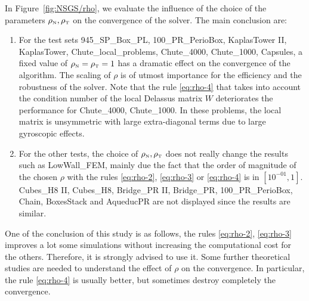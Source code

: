 In Figure~\ref{fig:NSGS/rho}, we evaluate the influence of the choice of the parameters $\rho_{\hbox{\tiny{N}}}, \rho_{\hbox{\tiny{T}}}$ on the convergence of the solver. The main conclusion are:
\begin{enumerate}
\item For the test sets 945\_SP\_Box\_PL, 100\_PR\_PerioBox, KaplasTower II, KaplasTower, Chute\_local\_problems, Chute\_4000, Chute\_1000, Capsules, a fixed value of $\rho_{\hbox{\tiny{N}}}=\rho_{\hbox{\tiny{T}}}=1$ has a dramatic effect on the convergence of the algorithm. The scaling of $\rho$ is of utmost importance for the efficiency and the robustness of the solver. Note that the rule  \eqref{eq:rho-4} that takes into account the condition number of the local Delassus matrix $W$ deteriorates the performance for  Chute\_4000, Chute\_1000. In these problems, the local matrix is unsymmetric with large extra-diagonal terms due to large gyroscopic effects.
  
\item For the other tests, the choice of $\rho_{\hbox{\tiny{N}}},\rho_{\hbox{\tiny{T}}}$ does not really change the results such as LowWall\_FEM, mainly due the fact that the order of magnitude of the chosen $\rho$ with the rules \eqref{eq:rho-2}, \eqref{eq:rho-3} or \eqref{eq:rho-4} is in $[10^{-01}, 1]$. Cubes\_H8 II, Cubes\_H8, Bridge\_PR II, Bridge\_PR, 100\_PR\_PerioBox, Chain, BoxesStack and AqueducPR are not displayed since the results are similar.
\end{enumerate}
One of the conclusion of this study is as follows, the rules \eqref{eq:rho-2}, \eqref{eq:rho-3} improves a lot some simulations without increasing the computational cost for the others. Therefore, it is strongly advised to use it. Some further theoretical studies are needed to understand the effect of $\rho$ on the convergence. In particular, the rule \eqref{eq:rho-4} is usually better, but sometimes destroy completely the convergence.
